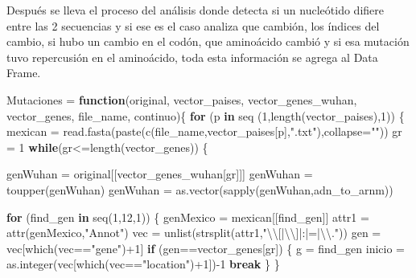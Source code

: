 \documentclass[
  12pt,
]{article}
\newenvironment{Shaded}{\begin{snugshade}}{\end{snugshade}}
\newcommand{\AttributeTok}[1]{\textcolor[rgb]{0.77,0.63,0.00}{#1}}
\newcommand{\ControlFlowTok}[1]{\textcolor[rgb]{0.13,0.29,0.53}{\textbf{#1}}}
\newcommand{\DecValTok}[1]{\textcolor[rgb]{0.00,0.00,0.81}{#1}}
\newcommand{\FunctionTok}[1]{\textcolor[rgb]{0.00,0.00,0.00}{#1}}
\newcommand{\NormalTok}[1]{#1}
\newcommand{\OtherTok}[1]{\textcolor[rgb]{0.56,0.35,0.01}{#1}}
\newcommand{\SpecialCharTok}[1]{\textcolor[rgb]{0.00,0.00,0.00}{#1}}
\newcommand{\StringTok}[1]{\textcolor[rgb]{0.31,0.60,0.02}{#1}}
\begin{document}
Después se lleva el proceso del análisis donde detecta si un nucleótido
difiere entre las 2 secuencias y si ese es el caso analiza que cambión,
los índices del cambio, si hubo un cambio en el codón, que aminoácido
cambió y si esa mutación tuvo repercusión en el aminoácido, toda esta
información se agrega al Data Frame.

\begin{Shaded}
\begin{Highlighting}[]
\NormalTok{Mutaciones }\OtherTok{=} \ControlFlowTok{function}\NormalTok{(original, vector\_paises, vector\_genes\_wuhan, vector\_genes, file\_name, continuo)\{}
  \ControlFlowTok{for}\NormalTok{ (p }\ControlFlowTok{in} \FunctionTok{seq}\NormalTok{ (}\DecValTok{1}\NormalTok{,}\FunctionTok{length}\NormalTok{(vector\_paises),}\DecValTok{1}\NormalTok{)) \{}
\NormalTok{    mexican }\OtherTok{=} \FunctionTok{read.fasta}\NormalTok{(}\FunctionTok{paste}\NormalTok{(}\FunctionTok{c}\NormalTok{(file\_name,vector\_paises[p],}\StringTok{".txt"}\NormalTok{),}\AttributeTok{collapse=}\StringTok{""}\NormalTok{))}
\NormalTok{    gr }\OtherTok{=} \DecValTok{1}
    \ControlFlowTok{while}\NormalTok{(gr}\SpecialCharTok{\textless{}=}\FunctionTok{length}\NormalTok{(vector\_genes)) \{    }

\NormalTok{      genWuhan }\OtherTok{=}\NormalTok{ original[[vector\_genes\_wuhan[gr]]]}
\NormalTok{      genWuhan }\OtherTok{=} \FunctionTok{toupper}\NormalTok{(genWuhan)}
\NormalTok{      genWuhan }\OtherTok{=} \FunctionTok{as.vector}\NormalTok{(}\FunctionTok{sapply}\NormalTok{(genWuhan,adn\_to\_arnm))}
      
      
      \ControlFlowTok{for}\NormalTok{ (find\_gen }\ControlFlowTok{in} \FunctionTok{seq}\NormalTok{(}\DecValTok{1}\NormalTok{,}\DecValTok{12}\NormalTok{,}\DecValTok{1}\NormalTok{)) \{}
\NormalTok{        genMexico }\OtherTok{=}\NormalTok{ mexican[[find\_gen]]}
\NormalTok{        attr1 }\OtherTok{=} \FunctionTok{attr}\NormalTok{(genMexico,}\StringTok{"Annot"}\NormalTok{)}
\NormalTok{        vec }\OtherTok{=} \FunctionTok{unlist}\NormalTok{(}\FunctionTok{strsplit}\NormalTok{(attr1,}\StringTok{"}\SpecialCharTok{\textbackslash{}\textbackslash{}}\StringTok{[|}\SpecialCharTok{\textbackslash{}\textbackslash{}}\StringTok{]|:|=|}\SpecialCharTok{\textbackslash{}\textbackslash{}}\StringTok{."}\NormalTok{))}
\NormalTok{        gen }\OtherTok{=}\NormalTok{ vec[}\FunctionTok{which}\NormalTok{(vec}\SpecialCharTok{==}\StringTok{"gene"}\NormalTok{)}\SpecialCharTok{+}\DecValTok{1}\NormalTok{]}
        \ControlFlowTok{if}\NormalTok{ (gen}\SpecialCharTok{==}\NormalTok{vector\_genes[gr]) \{}
\NormalTok{          g }\OtherTok{=}\NormalTok{ find\_gen}
\NormalTok{          inicio }\OtherTok{=} \FunctionTok{as.integer}\NormalTok{(vec[}\FunctionTok{which}\NormalTok{(vec}\SpecialCharTok{==}\StringTok{"location"}\NormalTok{)}\SpecialCharTok{+}\DecValTok{1}\NormalTok{])}\SpecialCharTok{{-}}\DecValTok{1}
          \ControlFlowTok{break}
\NormalTok{        \}}
\NormalTok{      \}}
      

\end{Highlighting}
\end{Shaded}
\end{document}
